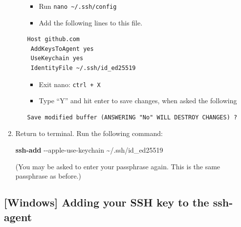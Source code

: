 \documentclass[
]{book}
\newenvironment{Shaded}{\begin{snugshade}}{\end{snugshade}}
\newcommand{\AttributeTok}[1]{\textcolor[rgb]{0.13,0.29,0.53}{#1}}
\newcommand{\FunctionTok}[1]{\textcolor[rgb]{0.13,0.29,0.53}{\textbf{#1}}}
\newcommand{\NormalTok}[1]{#1}
\providecommand{\tightlist}{%
  \setlength{\itemsep}{0pt}\setlength{\parskip}{0pt}}
\theoremstyle{definition}
\theoremstyle{definition}
\theoremstyle{definition}
\theoremstyle{definition}
\theoremstyle{remark}
\begin{document}
\begin{enumerate}
\begin{enumerate}
    \begin{itemize}
    \tightlist
    \item
      Run \texttt{nano\ \textasciitilde{}/.ssh/config}
    \item
      Add the following lines to this file.
    \end{itemize}

\begin{verbatim}
Host github.com
 AddKeysToAgent yes
 UseKeychain yes
 IdentityFile ~/.ssh/id_ed25519
\end{verbatim}

    \begin{itemize}
    \tightlist
    \item
      Exit nano: \texttt{ctrl\ +\ X}
    \item
      Type ``Y'' and hit enter to save changes, when asked the following
    \end{itemize}

\begin{verbatim}
Save modified buffer (ANSWERING "No" WILL DESTROY CHANGES) ?
\end{verbatim}
  \end{enumerate}
\item
  Return to terminal. Run the following command:

\begin{Shaded}
\begin{Highlighting}[]
\FunctionTok{ssh{-}add} \AttributeTok{{-}{-}apple{-}use{-}keychain}\NormalTok{ \textasciitilde{}/.ssh/id\_ed25519}
\end{Highlighting}
\end{Shaded}

  (You may be asked to enter your passphrase again. This is the same passphrase as before.)
\end{enumerate}

\subsection{{[}Windows{]} Adding your SSH key to the ssh-agent}\label{windows-add-ssh-key}
\end{document}
